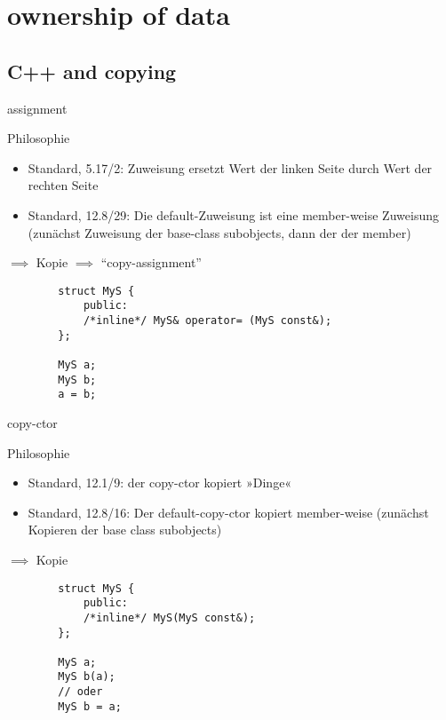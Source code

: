 \section{ownership of data}


\subsection{C++ and copying}

\begin{frame}[fragile]{assignment}
	\begin{block}{Philosophie}
		\begin{itemize}
			\item Standard, 5.17/2: Zuweisung ersetzt Wert der linken Seite durch Wert der rechten Seite
			\item Standard, 12.8/29: Die default-Zuweisung ist eine member-weise Zuweisung (zunächst Zuweisung der base-class subobjects, dann der der member)
		\end{itemize}
		
		$\implies$ Kopie $\implies$ \enquote{copy-assignment}
	\end{block}
	
	\pause
	
	\begin{lstlisting}
		struct MyS {
		    public:
		    /*inline*/ MyS& operator= (MyS const&);
		};
		
		MyS a;
		MyS b;
		a = b;
	\end{lstlisting}
\end{frame}

\begin{frame}[fragile]{copy-ctor}
	\begin{block}{Philosophie}
		\begin{itemize}
			\item Standard, 12.1/9: der copy-ctor kopiert »Dinge«
			\item Standard, 12.8/16: Der default-copy-ctor kopiert member-weise (zunächst Kopieren der base class subobjects)
		\end{itemize}
		
		$\implies$ Kopie
	\end{block}
	
	\begin{lstlisting}
		struct MyS {
		    public:
		    /*inline*/ MyS(MyS const&);
		};
		
		MyS a;
		MyS b(a);
		// oder
		MyS b = a;
	\end{lstlisting}
\end{frame}

